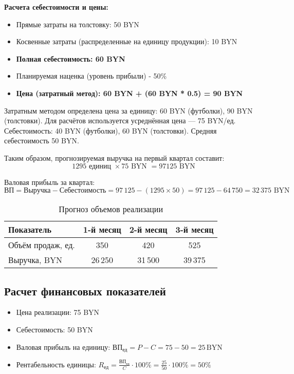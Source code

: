 \textbf{Расчета себестоимости и цены:}

\begin{itemize}[noitemsep]
\item Прямые затраты на толстовку: 50 BYN
\item Косвенные затраты (распределенные на единицу продукции): 10 BYN
\item \textbf{Полная себестоимость: 60  BYN}
\item Планируемая наценка (уровень прибыли) - 50\%
\item \textbf{Цена (затратный метод): 60 BYN + (60 BYN * 0.5) = 90 BYN}
\end{itemize}


Затратным методом определена цена за единицу: 60 BYN (футболки), 90 BYN (толстовки). Для расчётов используется усреднённая цена — 75 BYN/ед. 
Себестоимость: 40 BYN (футболки), 60 BYN (толстовки). Средняя себестоимость 50 BYN.

Таким образом, прогнозируемая выручка на первый квартал составит:
\begin{equation}
1295 \text{ единиц } \times 75 \text{ BYN } = 97 125 \text{ BYN}
\end{equation}

Валовая прибыль за квартал:
\[
\text{ВП} = \text{Выручка} - \text{Себестоимость} = 97\,125 - (1295 \times 50) = 97\,125 - 64\,750 = 32\,375 \text{ BYN}
\]



\begin{table}[h!]
    \centering
    \caption{Прогноз объемов реализации}
    \begin{tabular}{|l|c|c|c|}
        \hline
        Показатель & 1-й месяц & 2-й месяц & 3-й месяц \\
        \hline
        Объём продаж, ед. & 350 & 420 & 525 \\
        Выручка, BYN & 26\,250 & 31\,500 & 39\,375 \\
        \hline
    \end{tabular}
\end{table}


\subsection{Расчет финансовых показателей}

\begin{itemize}
    \item Цена реализации: 75 BYN
    \item Себестоимость: 50 BYN
    \item Валовая прибыль на единицу: \( \text{ВП}_\text{ед} = P - C = 75 - 50 = 25 \, \text{BYN} \)
    \item Рентабельность единицы: \( R_\text{ед} = \frac{\text{ВП}_\text{ед}}{C} \cdot 100\% = \frac{25}{50} \cdot 100\% = 50\% \)
\end{itemize}

